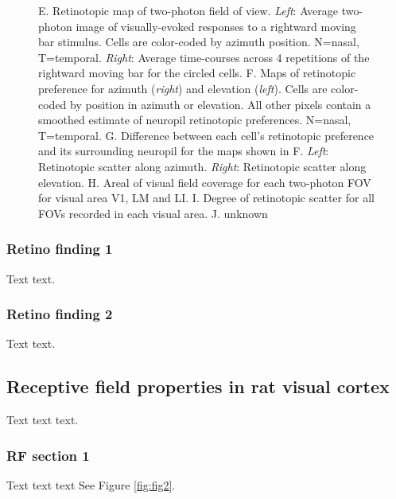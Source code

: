 \documentclass{article}
\begin{document}
\begin{figure}[ht]
  E.  Retinotopic map of two-photon field of view.  \textit{Left}: Average two-photon image of visually-evoked responses to a rightward moving bar stimulus.  Cells are color-coded by azimuth position. N=nasal, T=temporal.  \textit{Right}:  Average time-courses across 4 repetitions of the rightward moving bar for the circled cells. 
  F.  Maps of retinotopic preference for azimuth (\textit{right}) and elevation (\textit{left}).  Cells are color-coded by position in azimuth or elevation.  All other pixels contain a smoothed estimate of neuropil retinotopic preferences. N=nasal, T=temporal.
  G.  Difference between each cell’s retinotopic preference and its surrounding neuropil for the maps shown in F. \textit{Left}:  Retinotopic scatter along azimuth. \textit{Right}:  Retinotopic scatter along elevation.
  H.  Areal of visual field coverage for each two-photon FOV for visual area V1, LM and LI. 
  I.  Degree of retinotopic scatter for all FOVs recorded in each visual area.
  J.  unknown
  \label{fig:fig1}
\end{figure}

\subsubsection{Retino finding 1}
Text text. 

\subsubsection{Retino finding 2}
Text text. 



\subsection{Receptive field properties in rat visual cortex}
Text text text.


\subsubsection{RF section 1}
Text text text
See Figure \ref{fig:fig2}.
\end{document}
